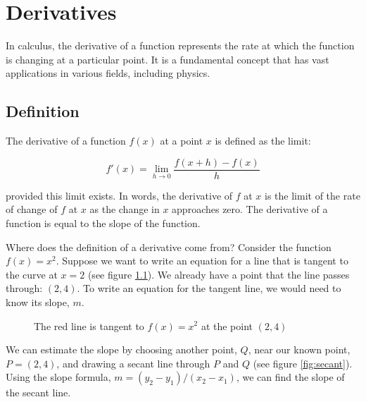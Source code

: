 \chapter{Derivatives}

In calculus, the derivative of a function represents the rate at which the 
function is changing at a particular point. It is a fundamental concept that 
has vast applications in various fields, including physics.

\section{Definition}

The derivative of a function $f(x)$ at a point $x$ is defined as the limit:

\begin{equation}
f'(x) = \lim_{{h \to 0}} \frac{f(x+h) - f(x)}{h}
\end{equation}

provided this limit exists. In words, the derivative of $f$ at $x$ is the 
limit of the rate of change of $f$ at $x$ as the change in $x$ approaches zero. 
The derivative of a function is equal to the slope  of the function. 

Where does the definition of a derivative come from? Consider the function 
$f(x) = x^2$. Suppose we want to write an equation for a line that is tangent 
to the curve at $x = 2$ (see figure \ref{fig:tangent}). We already have a 
point that the line passes through: $(2, 4)$. To write an equation for the 
tangent line, we would need to know its slope, $m$. 

\begin{figure}[htbp]
    \centering
    \caption{The red line is tangent to $f(x) = x^2$ at the point $(2, 4)$}
    \label{fig:tangent}
\end{figure}

We can estimate the slope by choosing another point, $Q$, near our known 
point, $P = (2, 4)$, and drawing a secant line through $P$ and $Q$ (see figure 
\ref{fig:secant}). Using the slope formula, $m = \left( y_2 - y_1 \right) / 
\left( x_2 - x_1 \right)$, we can find the slope of the secant line. 

